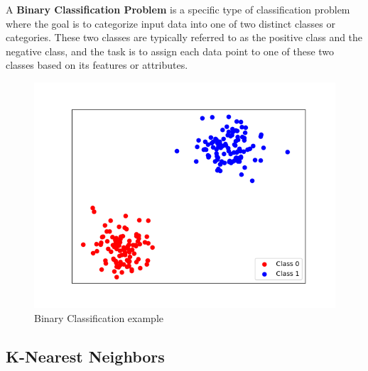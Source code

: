 A \textbf{Binary Classification Problem} is a specific type of classification problem where the goal is to categorize input data into one of two distinct classes or categories. 
These two classes are typically referred to as the positive class and the negative class, and the task is to assign each data point to one of these two classes based on its features or attributes.
\begin{figure}[H]
  \centering
  \includegraphics[width=0.6\linewidth]{graphics/BinaryClassification.png}
  \caption{Binary Classification example}
  \label{fig:bin_classification}
\end{figure}

\subsection{K-Nearest Neighbors}
\label{subsec:KNN}


